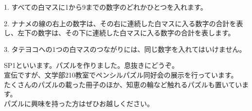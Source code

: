 \begin{description}
\item{1.} すべての白マスに1から9までの数字のどれかひとつを入れます。
\item{2.} ナナメの線の右上の数字は、その右に連続した白マスに入る数字の合計を表し、左下の数字は、その下に連続した白マスに入る数字の合計を表します。
\item{3.} タテヨコへの1つの白マスのつながりには、同じ数字を入れてはいけません。
\end{description}
SP1といいます。パズルを作りました。息抜きにどうぞ。\\
宣伝ですが、文学部210教室でペンシルパズル同好会の展示を行っています。\\
たくさんのパズルの載った冊子のほか、知恵の輪など触れるパズルも置いています。\\
パズルに興味を持った方はぜひお越しください。

